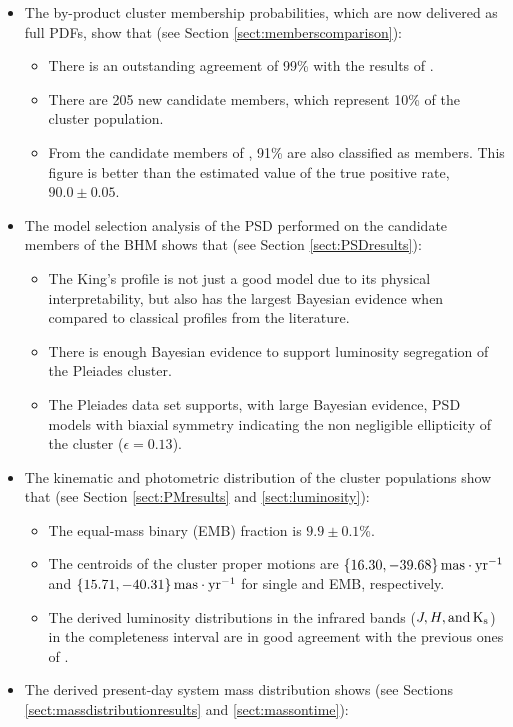 \begin{itemize}
\item The by-product cluster membership probabilities, which are now delivered as full PDFs, show that (see Section \ref{sect:memberscomparison}):
\begin{itemize}
\item  There is an outstanding agreement of 99\% with the results of \citet{Bouy2015}.
\item There are 205 new candidate members, which represent 10\% of the cluster population. 
\item From the candidate members of \citet{Rebull2016}, 91\% are also classified as members. This figure is better than the estimated value of the true positive rate, $ 90.0 \pm0.05$.
\end{itemize}
\item The model selection analysis of the PSD performed on the candidate members of the BHM shows that (see Section \ref{sect:PSDresults}):
\begin{itemize}
\item The King's profile \citep{King1962} is not just a good model due to its physical interpretability, but also has the largest Bayesian evidence when compared to classical profiles from the literature.
\item There is enough Bayesian evidence to support luminosity segregation of the Pleiades cluster.
\item The Pleiades data set supports, with large Bayesian evidence, PSD models with biaxial symmetry indicating the non negligible ellipticity of the cluster ($\epsilon=0.13$).
\end{itemize}
\item The kinematic and photometric distribution of the cluster populations show that (see Section \ref{sect:PMresults} and \ref{sect:luminosity}):
\begin{itemize}
\item The equal-mass binary (EMB) fraction is $9.9\pm0.1$\%.
\item The centroids of the cluster proper motions are $\{16.30,-39.68\}\,\rm{mas\cdot yr^{-1}}$ and $\{15.71,-40.31\}\,\rm{mas\cdot yr^{-1}}$ for single and EMB, respectively. 
\item The derived luminosity distributions in the infrared bands ($J,H, \rm{and} \,K_s$) in the completeness interval are in good agreement with the previous ones of \citet{Bouy2015}.
\end{itemize}
\item The derived present-day system mass distribution \cite[using an age of 120 Myr and the BT-Settl isochrone model of][]{Allard2012} shows (see Sections \ref{sect:massdistributionresults} and \ref{sect:massontime}):

\end{itemize}
